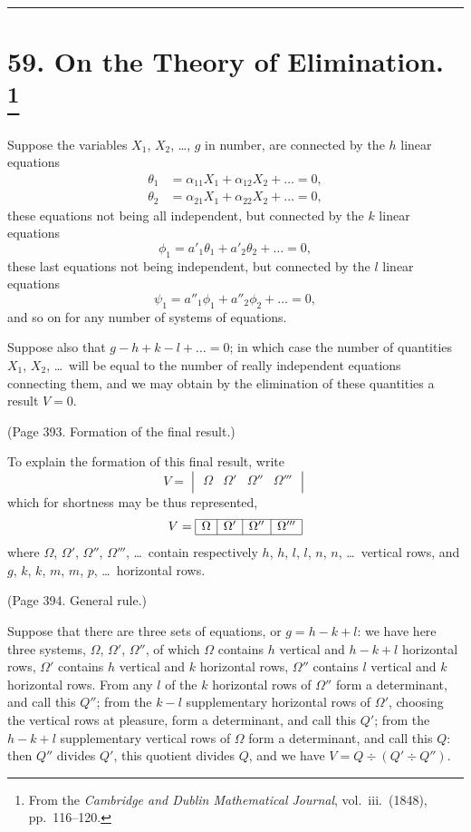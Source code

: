 \documentclass[11pt,a4paper]{book}
\begin{document}
\bigskip
\hrule
\bigskip

\newpage
\section[On the Theory of Elimination]{%
59. On the Theory of Elimination.%
\footnote{From the \textit{Cambridge and Dublin Mathematical Journal}, vol.~iii.\ (1848), pp.~116--120.}}

Suppose the variables $X_1$, $X_2$, \ldots, $g$ in number, are connected by the $h$ linear
equations
\begin{align*}
\theta_1 &= \alpha_{11}X_1 + \alpha_{12}X_2 + \ldots = 0, \\
\theta_2 &= \alpha_{21}X_1 + \alpha_{22}X_2 + \ldots = 0,
\end{align*}
these equations not being all independent, but connected by the $k$ linear equations
\[
\phi_1 = a'_1\theta_1 + a'_2\theta_2 + \ldots = 0,
\]
these last equations not being independent, but connected by the $l$ linear equations
\[
\psi_1 = a''_1\phi_1 + a''_2\phi_2 + \ldots = 0,
\]
and so on for any number of systems of equations.

Suppose also that $g - h + k - l + \ldots = 0$; in which case the number of quantities
$X_1$, $X_2$, \ldots\ will be equal to the number of really independent equations connecting
them, and we may obtain by the elimination of these quantities a result $V = 0$.

(Page 393. Formation of the final result.)

To explain the formation of this final result, write
\[
V =
\begin{vmatrix}
\Omega & \Omega' & \Omega'' & \Omega''' \\
\end{vmatrix}
\]
which for shortness may be thus represented,
\[
V =
\begin{array}{|c|c|c|c|}
\hline
\Omega & \Omega' & \Omega'' & \Omega''' \\
\hline
\end{array}
\]
where $\Omega$, $\Omega'$, $\Omega''$, $\Omega'''$, \ldots\ contain respectively $h$, $h$, $l$, $l$, $n$, $n$, \ldots\ vertical rows, and
$g$, $k$, $k$, $m$, $m$, $p$, \ldots\ horizontal rows.

(Page 394. General rule.)

Suppose that there are three sets of equations, or $g = h - k + l$: we have here three
systems, $\Omega$, $\Omega'$, $\Omega''$, of which $\Omega$ contains $h$ vertical and $h-k+l$ horizontal rows, $\Omega'$
contains $h$ vertical and $k$ horizontal rows, $\Omega''$ contains $l$ vertical and $k$ horizontal rows.
From any $l$ of the $k$ horizontal rows of $\Omega''$ form a determinant, and call this $Q''$; from
the $k-l$ supplementary horizontal rows of $\Omega'$, choosing the vertical rows at pleasure,
form a determinant, and call this $Q'$; from the $h-k+l$ supplementary vertical rows
of $\Omega$ form a determinant, and call this $Q$: then $Q''$ divides $Q'$, this quotient divides
$Q$, and we have $V = Q \div (Q' \div Q'')$.
\end{document}
